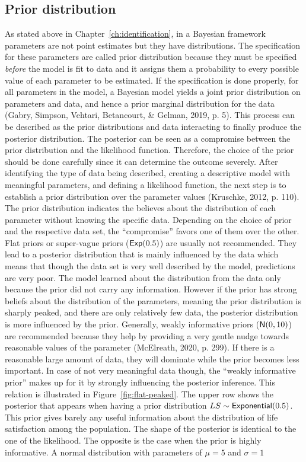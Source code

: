 \documentclass[a4, 12pt]{article}
\begin{document}
\hypertarget{prior-distribution}{%
\subsection{Prior distribution}\label{prior-distribution}}

\label{sec:priors}
As stated above in Chapter~\ref{ch:identification}, in a Bayesian framework parameters are not point estimates but they have distributions. The specification for these parameters are called prior distribution because they must be specified \emph{before} the model is fit to data and it assigns them a probability to every possible value of each parameter to be estimated. If the specification is done properly, for all parameters in the model, a Bayesian model yields a joint prior distribution on parameters and data, and hence a prior marginal distribution for the data (Gabry, Simpson, Vehtari, Betancourt, \& Gelman, 2019, p. 5). This process can be described as the prior distributions and data interacting to finally produce the posterior distribution. The posterior can be seen as a compromise between the prior distribution and the likelihood function. Therefore, the choice of the prior should be done carefully since it can determine the outcome severely. After identifying the type of data being described, creating a descriptive model with meaningful parameters, and defining a likelihood function, the next step is to establish a prior distribution over the parameter values (Kruschke, 2012, p. 110). The prior distribution indicates the believes about the distribution of each parameter without knowing the specific data. Depending on the choice of prior and the respective data set, the ``compromise'' favors one of them over the other. Flat priors or super-vague priors (\({\sf Exp}(0.5)\)) are usually not recommended. They lead to a posterior distribution that is mainly influenced by the data which means that though the data set is very well described by the model, predictions are very poor. The model learned about the distribution from the data only because the prior did not carry any information. However if the prior has strong beliefs about the distribution of the parameters, meaning the prior distribution is sharply peaked, and there are only relatively few data, the posterior distribution is more influenced by the prior. Generally, weakly informative priors (\({\sf N}(0,10)\)) are recommended because they help by providing a very gentle nudge towards reasonable values of the parameter (McElreath, 2020, p. 299). If there is a reasonable large amount of data, they will dominate while the prior becomes less important. In case of not very meaningful data though, the ``weakly informative prior'' makes up for it by strongly influencing the posterior inference. This relation is illustrated in Figure~\ref{fig:flat-peaked}. The upper row shows the posterior that appears when having a prior distribution \(LS \sim {\sf Exponential}(0.5)\). This prior gives barely any useful information about the distribution of life satisfaction among the population. The shape of the posterior is identical to the one of the likelihood. The opposite is the case when the prior is highly informative. A normal distribution with parameters of \(\mu = 5\) and \(\sigma = 1\) 
\end{document}
